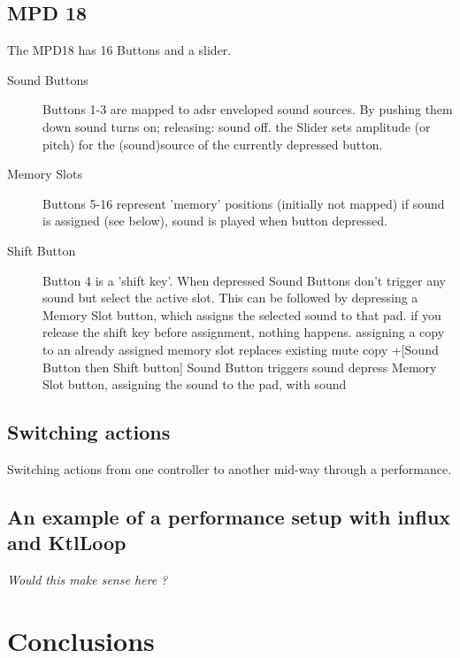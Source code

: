 \documentclass{article}
\begin{document}
\subsection{MPD 18}
\label{sub:mpd_18}

The MPD18 has 16 Buttons and a slider.

\begin{description}
 \item [Sound Buttons] Buttons 1-3 are mapped to adsr enveloped sound sources.
        By pushing them down sound turns on; releasing: sound off.
    the Slider sets amplitude (or pitch) for the (sound)source of the currently depressed button.
 \item [Memory Slots] Buttons 5-16 represent 'memory' positions (initially not mapped)
        if sound is assigned (see below), sound is played when button depressed.
 \item [Shift Button] Button 4 is a 'shift key'. When depressed
        Sound Buttons don't trigger any sound but select the active slot. This can be followed by
        depressing a Memory Slot button, which assigns the selected sound to that pad.
        if you release the shift key before assignment, nothing happens.
        assigning a copy to an already assigned memory slot replaces existing
        mute copy +[Sound Button then Shift button]
        Sound Button triggers sound
        depress Memory Slot button, assigning the sound to the pad, with sound
\end{description}
       
\subsection{Switching actions}
\label{sub:switching_actions}

Switching actions from one controller to another mid-way through a performance.

\subsection{An example of a performance setup with influx and KtlLoop}

\emph{Would this make sense here ?}

\section{Conclusions}
\label{sec:conclusions}
\end{document}
